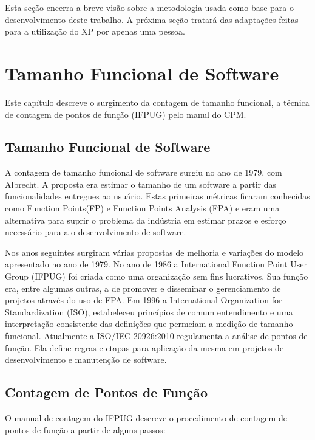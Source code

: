 Esta seção encerra a breve visão sobre a metodologia usada como base para o desenvolvimento deste trabalho. A próxima seção tratará das adaptações feitas para a utilização do XP por apenas uma pessoa.


\chapter[Tamanho Funcional de Software]{Tamanho Funcional de Software}

Este capítulo descreve o surgimento da contagem de tamanho funcional, a técnica de contagem de pontos de função (IFPUG) pelo manul do CPM.

\section{Tamanho Funcional de Software}

A contagem de tamanho funcional de software surgiu no ano de 1979, com Albrecht. A proposta era estimar o tamanho de um software a partir das funcionalidades entregues ao usuário. Estas primeiras métricas ficaram conhecidas como Function Points(FP)  e  Function Points Analysis (FPA)  e eram uma alternativa para suprir o problema da indústria em estimar prazos e esforço necessário para a o desenvolvimento de software.

Nos anos seguintes surgiram várias propostas de melhoria e variações do modelo apresentado no ano de 1979. No ano de 1986 a International Function Point User Group (IFPUG) foi criada como uma organização sem fins lucrativos. Sua função era, entre algumas outras, a de promover e disseminar o gerenciamento de projetos através do uso de FPA. Em 1996 a International Organization for Standardization (ISO), estabeleceu princípios de comum entendimento e uma interpretação consistente das  definições que permeiam a medição de tamanho funcional. Atualmente a ISO/IEC 20926:2010 regulamenta a análise de pontos de função. Ela define regras e etapas para aplicação da mesma em projetos de desenvolvimento e manutenção de software.

\section{Contagem de Pontos de Função}

O manual de contagem do IFPUG descreve o procedimento de contagem de pontos de função a partir de alguns passos:

